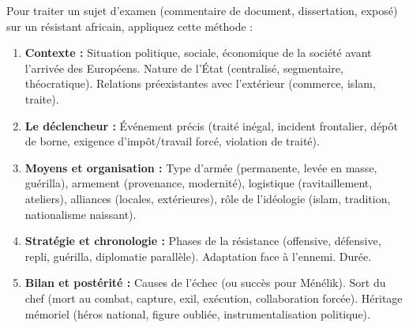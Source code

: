 \documentclass[11pt]{article}
\begin{document}
\begin{methode}
Pour traiter un sujet d'examen (commentaire de document, dissertation, exposé) sur un résistant africain, appliquez cette méthode :
\begin{enumerate}
    \item \textbf{Contexte :} Situation politique, sociale, économique de la société avant l'arrivée des Européens. Nature de l'État (centralisé, segmentaire, théocratique). Relations préexistantes avec l'extérieur (commerce, islam, traite).
    \item \textbf{Le déclencheur :} Événement précis (traité inégal, incident frontalier, dépôt de borne, exigence d'impôt/travail forcé, violation de traité).
    \item \textbf{Moyens et organisation :} Type d'armée (permanente, levée en masse, guérilla), armement (provenance, modernité), logistique (ravitaillement, ateliers), alliances (locales, extérieures), rôle de l'idéologie (islam, tradition, nationalisme naissant).
    \item \textbf{Stratégie et chronologie :} Phases de la résistance (offensive, défensive, repli, guérilla, diplomatie parallèle). Adaptation face à l'ennemi. Durée.
    \item \textbf{Bilan et postérité :} Causes de l'échec (ou succès pour Ménélik). Sort du chef (mort au combat, capture, exil, exécution, collaboration forcée). Héritage mémoriel (héros national, figure oubliée, instrumentalisation politique).
\end{enumerate}
\end{methode}
\end{document}
